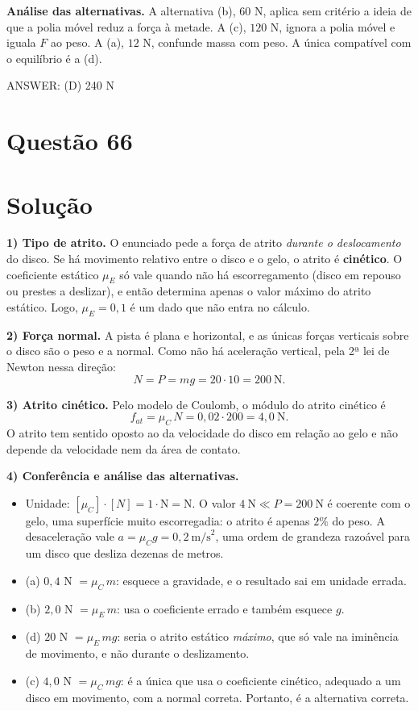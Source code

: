 \documentclass{article}%
\begin{document}
\textbf{Análise das alternativas.} A alternativa (b), $60$ N, aplica sem critério a ideia de que a polia móvel reduz a força à metade. A (c), $120$ N, ignora a polia móvel e iguala $F$ ao peso. A (a), $12$ N, confunde massa com peso. A única compatível com o equilíbrio é a (d).

ANSWER: (D) 240 N%
\newpage%
\section*{Questão 66}

\section*{Solução}

\textbf{1) Tipo de atrito.} O enunciado pede a força de atrito \emph{durante o deslocamento} do disco. Se há movimento relativo entre o disco e o gelo, o atrito é \textbf{cinético}. O coeficiente estático $\mu_E$ só vale quando não há escorregamento (disco em repouso ou prestes a deslizar), e então determina apenas o valor máximo do atrito estático. Logo, $\mu_E = 0{,}1$ é um dado que não entra no cálculo.

\textbf{2) Força normal.} A pista é plana e horizontal, e as únicas forças verticais sobre o disco são o peso e a normal. Como não há aceleração vertical, pela 2ª lei de Newton nessa direção:
\[
N = P = m g = 20 \cdot 10 = 200 \ \text{N}.
\]

\textbf{3) Atrito cinético.} Pelo modelo de Coulomb, o módulo do atrito cinético é
\[
f_{at} = \mu_C \, N = 0{,}02 \cdot 200 = 4{,}0 \ \text{N}.
\]
O atrito tem sentido oposto ao da velocidade do disco em relação ao gelo e não depende da velocidade nem da área de contato.

\textbf{4) Conferência e análise das alternativas.}
\begin{itemize}
\item Unidade: $[\mu_C]\cdot[N] = 1 \cdot \text{N} = \text{N}$. O valor $4\ \text{N} \ll P = 200\ \text{N}$ é coerente com o gelo, uma superfície muito escorregadia: o atrito é apenas $2\%$ do peso. A desaceleração vale $a = \mu_C g = 0{,}2\ \text{m/s}^2$, uma ordem de grandeza razoável para um disco que desliza dezenas de metros.
\item (a) $0{,}4$ N $= \mu_C\, m$: esquece a gravidade, e o resultado sai em unidade errada.
\item (b) $2{,}0$ N $= \mu_E\, m$: usa o coeficiente errado e também esquece $g$.
\item (d) $20$ N $= \mu_E\, m g$: seria o atrito estático \emph{máximo}, que só vale na iminência de movimento, e não durante o deslizamento.
\item (c) $4{,}0$ N $= \mu_C\, m g$: é a única que usa o coeficiente cinético, adequado a um disco em movimento, com a normal correta. Portanto, é a alternativa correta.
\end{itemize}
\end{document}
